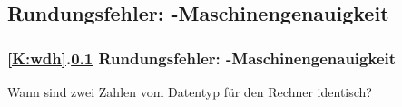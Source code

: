 \def\stitle{Rundungsfehler: -Maschinengenauigkeit}
\subsection{\stitle}\label{S:Maschinengenauigkeit1}
\begin{frame}[t]%
 \frametitle{\ref{K:wdh}.\ref{S:Maschinengenauigkeit1} \stitle}

Wann sind zwei Zahlen vom Datentyp  f\"ur den Rechner identisch?


\end{frame}
